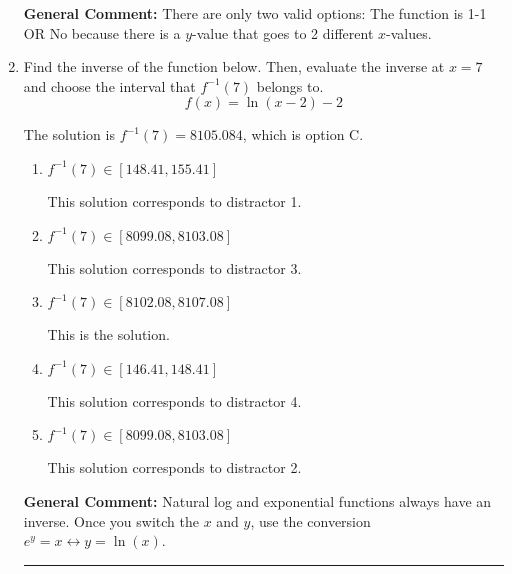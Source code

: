 \documentclass{extbook}[14pt]
\newcommand{\litem}[1]{\item #1

\rule{\textwidth}{0.4pt}}
\begin{document}
\begin{enumerate}
{\textbf{General Comment:} There are only two valid options: The function is 1-1 OR No because there is a $y$-value that goes to 2 different $x$-values.
}
\litem{
Find the inverse of the function below. Then, evaluate the inverse at $x = 7$ and choose the interval that $f^{-1}(7)$ belongs to.
\[ f(x) = \ln{(x-2)}-2 \]

The solution is \( f^{-1}(7) = 8105.084 \), which is option C.\begin{enumerate}[label=\Alph*.]
\item \( f^{-1}(7) \in [148.41, 155.41] \)

 This solution corresponds to distractor 1.
\item \( f^{-1}(7) \in [8099.08, 8103.08] \)

 This solution corresponds to distractor 3.
\item \( f^{-1}(7) \in [8102.08, 8107.08] \)

 This is the solution.
\item \( f^{-1}(7) \in [146.41, 148.41] \)

 This solution corresponds to distractor 4.
\item \( f^{-1}(7) \in [8099.08, 8103.08] \)

 This solution corresponds to distractor 2.
\end{enumerate}

\textbf{General Comment:} Natural log and exponential functions always have an inverse. Once you switch the $x$ and $y$, use the conversion $ e^y = x \leftrightarrow y=\ln(x)$.
}
\end{enumerate}
\end{document}
